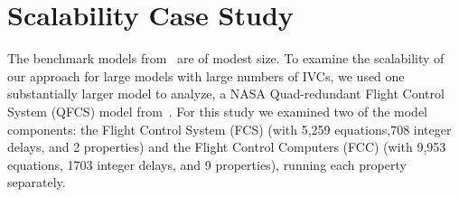 \section{Scalability Case Study}

\label{sec:qfc}
The benchmark models from~\cite{expr} are of modest size.  To examine the scalability of our approach for large models with large numbers of IVCs, we used one substantially larger model to analyze, a NASA Quad-redundant Flight Control System (QFCS) model from~\cite{NFM2015:backes}. %
For this study we examined two of the model components: the Flight Control System (FCS) (with 5,259 equations,708 integer delays, and 2 properties) and the Flight Control Computers (FCC) (with 9,953 equations, 1703 integer delays, and 9 properties), running each property separately.



